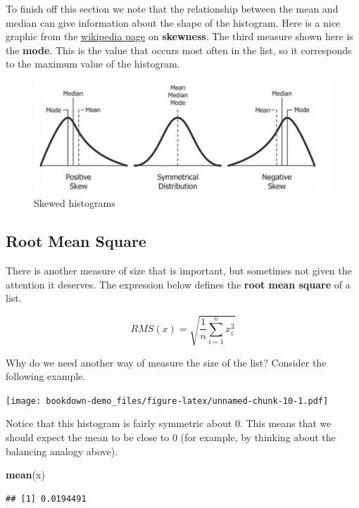 \documentclass[]{book}
\newenvironment{Shaded}{\begin{snugshade}}{\end{snugshade}}
\newcommand{\KeywordTok}[1]{\textcolor[rgb]{0.13,0.29,0.53}{\textbf{#1}}}
\newcommand{\NormalTok}[1]{#1}
\begin{document}
To finish off this section we note that the relationship between the mean and median can give information about the shape of the histogram. Here is a nice graphic from the \href{https://en.wikipedia.org/wiki/Skewness}{wikipedia page} on \textbf{skewness}.
The third measure shown here is the \textbf{mode}. This is the value that occurs most often in the list, so it corresponds to the maximum value of the histogram.

\begin{figure}
\centering
\includegraphics{hist_skew.png}
\caption{Skewed histograms}
\end{figure}

\hypertarget{root-mean-square}{%
\subsection{Root Mean Square}\label{root-mean-square}}

There is another measure of size that is important, but sometimes not given the attention it deserves. The expression below defines the \textbf{root mean square} of a list.

\[RMS(x) = \sqrt{\frac{1}{n}\sum_{i=1}^n x_i^2}\]

Why do we need another way of measure the size of the list? Consider the following example.

\texttt{[image: bookdown-demo\_files/figure-latex/unnamed-chunk-10-1.pdf]}

Notice that this histogram is fairly symmetric about \(0\). This means that we should expect the mean to be close to \(0\) (for example, by thinking about the balancing analogy above).

\begin{Shaded}
\begin{Highlighting}[]
\KeywordTok{mean}\NormalTok{(x)}
\end{Highlighting}
\end{Shaded}

\begin{verbatim}
## [1] 0.0194491
\end{verbatim}
\end{document}
